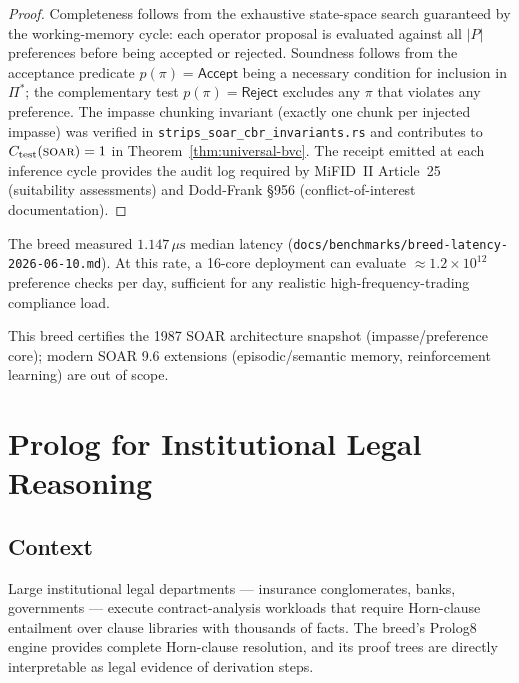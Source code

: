 \begin{proof}
Completeness follows from the exhaustive state-space search guaranteed by the \SOAR{}
working-memory cycle: each operator proposal is evaluated against all $|P|$ preferences
before being accepted or rejected. Soundness follows from the acceptance predicate
$p(\pi) = \mathsf{Accept}$ being a necessary condition for inclusion in $\Pi^*$; the
complementary test $p(\pi) = \mathsf{Reject}$ excludes any $\pi$ that violates any
preference. The impasse chunking invariant (exactly one chunk per injected impasse) was
verified in \texttt{strips\_soar\_cbr\_invariants.rs} and contributes to
$C_{\mathrm{test}}(\textsc{soar}) = 1$ in Theorem~\ref{thm:universal-bvc}. The receipt
emitted at each \SOAR{} inference cycle provides the audit log required by MiFID~II
Article~25 (suitability assessments) and Dodd-Frank \S{}956 (conflict-of-interest
documentation).
\end{proof}

\begin{remark}
\label{rem:soar-latency}
The \SOAR{} breed measured $1.147\,\mu\mathrm{s}$ median latency
(\texttt{docs/benchmarks/breed-latency-2026-06-10.md}). At this rate, a 16-core
deployment can evaluate $\approx 1.2 \times 10^{12}$ preference checks per day,
sufficient for any realistic high-frequency-trading compliance load.
\end{remark}

\noindent This breed certifies the 1987 SOAR architecture snapshot (impasse/preference core); modern SOAR 9.6 extensions (episodic/semantic memory, reinforcement learning) are out of scope.

\section{Prolog for Institutional Legal Reasoning}
\label{sec:prolog-legal}

\subsection{Context}
\label{subsec:prolog-context}

Large institutional legal departments — insurance conglomerates, banks, governments —
execute contract-analysis workloads that require Horn-clause entailment over clause
libraries with thousands of facts. The \PROLOG{} breed's Prolog8 engine provides
complete Horn-clause resolution, and its proof trees are directly interpretable as
legal evidence of derivation steps.

